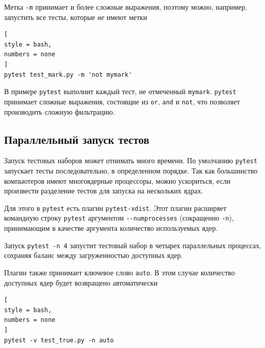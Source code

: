 \documentclass[%
	11pt,
	a4paper,
	utf8,
		]{article}
\begin{document}
Метка \verb|-m| принимает и более сложные выражения, поэтому можно, например, запустить все тесты, которые \textit{не} имеют метки
\begin{lstlisting}[
style = bash,
numbers = none	
]
pytest test_mark.py -m 'not mymark'
\end{lstlisting}

В примере \texttt{pytest} выполнит каждый тест, не отмеченный \texttt{mymark}. \texttt{pytest} принимает сложные выражения, состоящие из \texttt{or}, \texttt{and} и \texttt{not}, что позволяет производить сложную фильтрацию.

\subsection{Параллельный запуск тестов}

Запуск тестовых наборов может отнимать много времени. По умолчанию \texttt{pytest} запускает тесты последовательно, в определенном порядке. Так как большинство компьютеров имеют многоядерные процессоры, можно ускориться, если произвести разделение тестов для запуска на нескольких ядрах.

Для этого в \texttt{pytest} есть плагин \texttt{pytest-xdist}. Этот плагин расширяет командную строку \texttt{pytest} аргументом \verb|--numprocesses| (сокращенно \verb|-n|), принимающим в качестве аргумента количество используемых ядер.

Запуск \texttt{pytest -n 4} запустит тестовый набор в четырех параллельных процессах, сохраняя баланс между загруженностью доступных ядер.

Плагин также принимает ключевое слово \texttt{auto}. В этом случае количество доступных ядер будет возвращено автоматически
\begin{lstlisting}[
style = bash,
numbers = none	
]
pytest -v test_true.py -n auto
\end{lstlisting}
\end{document}
